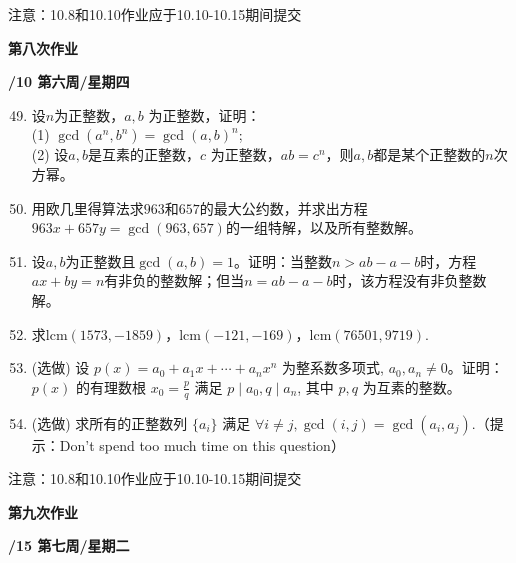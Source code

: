 \documentclass[a4paper,12pt]{article}
\begin{document}
{\color{red} 注意：10.8和10.10作业应于10.10-10.15期间提交}

\newpage
\head

 \begin{center} %
	{\Large \bf 第八次作业} %
	\vspace{2mm}
	
	{\bf{}/10 \quad  第六周/星期四} %
\end{center} 

\begin{enumerate}\setcounter{enumi}{48}
    \item 设$n$为正整数，$a,b$ 为正整数，证明：\\
    (1) $\gcd(a^n,b^n)=\gcd(a,b)^n$;\\
    (2) 设$a,b$是互素的正整数，$c$ 为正整数，$ab=c^n$，则$a,b$都是某个正整数的$n$次方幂。
    \item 用欧几里得算法求$963$和$657$的最大公约数，并求出方程$963x+657y=\gcd(963,657)$的一组特解，以及所有整数解。
    \item 设$a,b$为正整数且$\gcd(a,b)=1$。证明：当整数$n>ab-a-b$时，方程$ax+by=n$有非负的整数解；但当$n=ab-a-b$时，该方程没有非负整数解。
    \item 求$\mathrm{lcm}(1573,-1859)$，$\mathrm{lcm}(-121,-169)$，$\mathrm{lcm}(76501,9719)$.

    \item  {\color{red} (选做)} 设 $p(x)=a_0+a_1x+\cdots+a_nx^n$ 为整系数多项式, $a_0,a_n\not=0$。证明：$p(x)$ 的有理数根 $x_0=\frac{p}{q}$ 满足 $p\mid a_0,q\mid a_n$, 其中 $p,q$ 为互素的整数。

    \item  {\color{red} (选做)} 求所有的正整数列 $\{a_i\}$ 满足 $\forall i\not=j, \gcd(i,j)=\gcd(a_i,a_j)$.（提示：Don't spend too much time on this question）
\end{enumerate}


{\color{red} 注意：10.8和10.10作业应于10.10-10.15期间提交}

\newpage
\head


 \begin{center} %
	{\Large \bf 第九次作业} %
	\vspace{2mm}
	
	{\bf{}/15 \quad  第七周/星期二} %
\end{center} 
\end{document}
